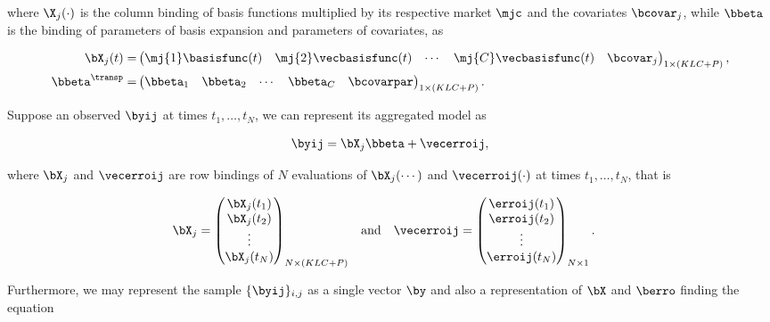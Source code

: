 \noindent where $\X_j(\cdot)$ is the column binding of basis functions multiplied by its respective market $\mjc$ and the covariates $\bcovar_j$, while $\bbeta$ is the binding of parameters of basis expansion and parameters of covariates, as

\begin{align}
  \bX_j(t)
  =&
     \begin{pmatrix}
       \mj{1} \basisfunc(t)
       &    \mj{2} \vecbasisfunc(t)
       & \cdots
       &    \mj{C} \vecbasisfunc(t)
       & \bcovar_j
     \end{pmatrix}_{1 \times (KLC+P)}, \\
  \bbeta^\transp
  = &
      \begin{pmatrix}
        \bbeta_1
        &\bbeta_2
        &\cdots
        &\bbeta_C
        &\bcovarpar
      \end{pmatrix}_{1 \times (KLC+P)}.
\end{align}

Suppose an observed $\byij$ at times $t_1, \dots, t_N$, we can represent its aggregated model as

\begin{equation}
  \label{eq:yijvec}
  \byij = \bX_j \bbeta + \vecerroij,
\end{equation}

\noindent where $\bX_j$ and $\vecerroij$ are row bindings of $N$ evaluations of $\bX_j(\cdots)$ and $\vecerroij(\cdot)$ at times $t_1, \dots, t_N$, that is

\begin{align}
  &\bX_j
  =
  \begin{pmatrix}
    \bX_j(t_1) \\
    \bX_j(t_2) \\
    \vdots \\
    \bX_j(t_N) 
  \end{pmatrix}_{N \times (KLC+P)}
  &
    \text{and}
  &
  &
    \vecerroij
    =
    \begin{pmatrix}
      \erroij(t_1) \\
      \erroij(t_2) \\
      \vdots \\
      \erroij(t_N) 
    \end{pmatrix}_{N \times 1}.
  &
\end{align}

Furthermore, we may represent the sample $\{ \byij \}_{i,j}$ as a single vector $\by$ and also a representation of $\bX$ and $\berro$ finding the equation

